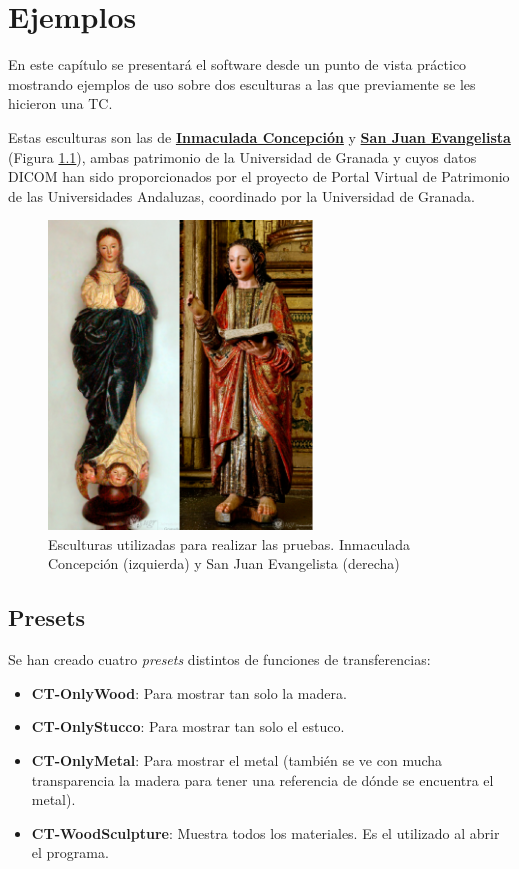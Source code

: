 \chapter{Ejemplos}

En este capítulo se presentará el software desde un punto de vista práctico mostrando ejemplos de uso sobre dos esculturas a las que previamente se les hicieron una TC.

Estas esculturas son las de \href{http://patrimonio3d.ugr.es/index.php/granada/escultura/item/18-inmaculada-concepcion}{\textbf{Inmaculada Concepción}} y \href{http://patrimonio3d.ugr.es/index.php/granada/escultura/item/6-san-juan-evangelista}{\textbf{San Juan Evangelista}} (Figura \ref{fig:figuras_reales}), ambas patrimonio de la Universidad de Granada y cuyos datos DICOM han sido proporcionados por el proyecto de Portal Virtual de Patrimonio de las Universidades Andaluzas, coordinado por la Universidad de Granada.

\begin{figure}[H]
	\centering
	\includegraphics[width=7cm]{imagenes/figuras_reales}
	\caption{Esculturas utilizadas para realizar las pruebas. Inmaculada Concepción (izquierda) y San Juan Evangelista (derecha)}
	\label{fig:figuras_reales}
\end{figure}

\section{Presets}

Se han creado cuatro \textit{presets} distintos de funciones de transferencias:

\begin{itemize}
	\item \textbf{CT-OnlyWood}: Para mostrar tan solo la madera.
	\item \textbf{CT-OnlyStucco}: Para mostrar tan solo el estuco.
	\item \textbf{CT-OnlyMetal}: Para mostrar el metal (también se ve con mucha transparencia la madera para tener una referencia de dónde se encuentra el metal).
	\item \textbf{CT-WoodSculpture}: Muestra todos los materiales. Es el utilizado al abrir el programa.
\end{itemize}

